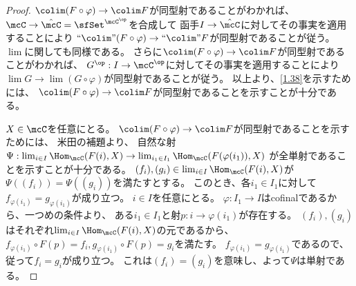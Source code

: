 \documentclass[uplatex,dvipdfmx]{jsarticle}
\begin{document}
\begin{proof}
  \(\colim (F\circ \varphi) \to \colim F\)が同型射であることがわかれば、
  \(\mcC\to \hat{\mcC}=\sfSet^{\mcC^{\op}}\)を合成して
  函手\(I\to \hat{\mcC}\)に対してその事実を適用することにより
  \(``\colim" (F\circ \varphi) \to ``\colim" F\)が同型射であることが従う。
  \(\lim\)に関しても同様である。
  さらに\(\colim (F\circ \varphi) \to \colim F\)が同型射であることがわかれば、
  \(G^{\op}:I\to \mcC^{\op}\)に対してその事実を適用することにより
  \(\lim G \to \lim (G\circ \varphi)\)が同型射であることが従う。
  以上より、\autoref{1.38}を示すためには、
  \(\colim (F\circ \varphi) \to \colim F\)が同型射であることを示すことが十分である。

  \(X\in \mcC\)を任意にとる。
  \(\colim (F\circ \varphi) \to \colim F\)が同型射であることを示すためには、
  米田の補題より、
  自然な射
  \(\Psi:\lim_{i\in I}\Hom_{\mcC}(F(i),X) \to
  \lim_{i_1\in I_1}\Hom_{\mcC}(F(\varphi(i_1)),X)\)
  が全単射であることを示すことが十分である。
  \((f_i),(g_i)\in \lim_{i\in I}\Hom_{\mcC}(F(i),X)\)が
  \(\Psi((f_i)) = \Psi((g_i))\)を満たすとする。
  このとき、各\(i_1\in I_1\)に対して
  \(f_{\varphi(i_1)} = g_{\varphi(i_1)}\)が成り立つ。
  \(i\in I\)を任意にとる。
  \(\varphi:I_1\to I\)はcofinalであるから、一つめの条件より、
  ある\(i_1\in I_1\)と射\(p:i\to \varphi(i_1)\)が存在する。
  \((f_i),(g_i)\)はそれぞれ\(\lim_{i\in I}\Hom_{\mcC}(F(i),X)\)の元であるから、
  \(f_{\varphi(i_1)}\circ F(p) = f_i, g_{\varphi(i_1)} \circ F(p) = g_i\)を満たす。
  \(f_{\varphi(i_1)} = g_{\varphi(i_1)}\)であるので、
  従って\(f_i = g_i\)が成り立つ。
  これは\((f_i)=(g_i)\)を意味し、よって\(\Psi\)は単射である。


\end{proof}
\end{document}
